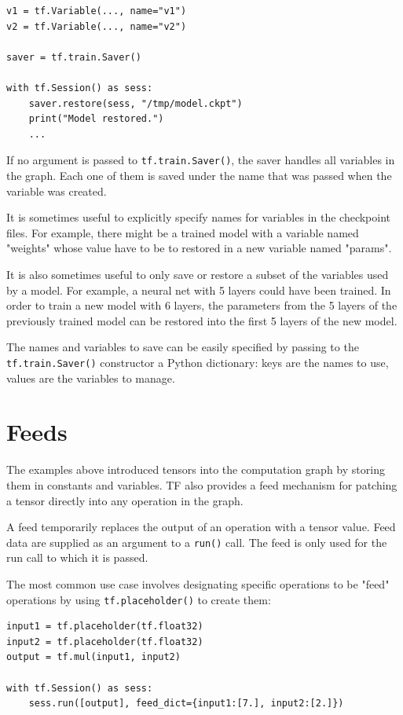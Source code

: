 \begin{lstlisting}
v1 = tf.Variable(..., name="v1")
v2 = tf.Variable(..., name="v2")

saver = tf.train.Saver()

with tf.Session() as sess:
    saver.restore(sess, "/tmp/model.ckpt")
    print("Model restored.")
    ...
\end{lstlisting}

If no argument is passed to \lstinline|tf.train.Saver()|, the saver handles all variables in the graph. Each one of them is saved under the name that was passed when the variable was created.

It is sometimes useful to explicitly specify names for variables in the checkpoint files. For example, there might be a trained model with a variable named "weights" whose value have to be to restored in a new variable named "params".

It is also sometimes useful to only save or restore a subset of the variables used by a model. For example, a neural net with 5 layers could have been trained. In order to train a new model with 6 layers, the parameters from the 5 layers of the previously trained model can be restored into the first 5 layers of the new model.

The names and variables to save can be easily specified by passing to the \lstinline|tf.train.Saver()| constructor a Python dictionary: keys are the names to use, values are the variables to manage.

\section{Feeds}

The examples above introduced tensors into the computation graph by storing them in constants and variables. \acs{TF} also provides a feed mechanism for patching a tensor directly into any operation in the graph.

A feed temporarily replaces the output of an operation with a tensor value. Feed data are supplied as an argument to a \lstinline|run()| call. The feed is only used for the run call to which it is passed.

The most common use case involves designating specific operations to be "feed" operations by using \lstinline|tf.placeholder()| to create them:

\begin{lstlisting}
input1 = tf.placeholder(tf.float32)
input2 = tf.placeholder(tf.float32)
output = tf.mul(input1, input2)

with tf.Session() as sess:
    sess.run([output], feed_dict={input1:[7.], input2:[2.]})
\end{lstlisting}


